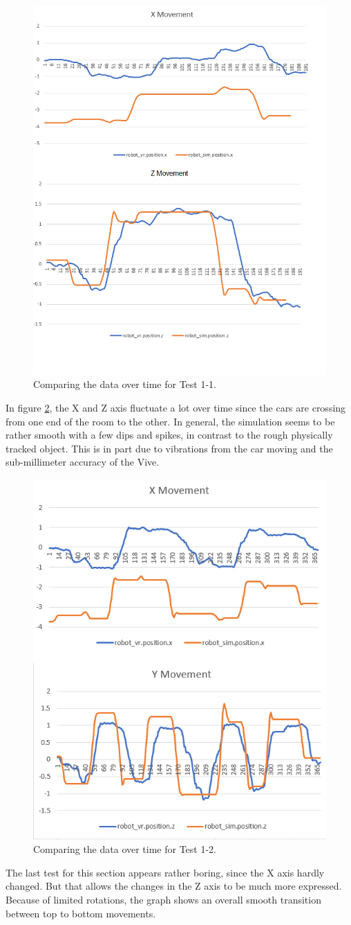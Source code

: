 \documentclass[10pt,a4paper]{article}
\begin{document}
	\begin{figure}
		\centering
		\includegraphics[width=.4\textwidth]{Test1_charts/t1_1_x_z.png}
		\caption{Comparing the data over time for Test 1-1.}
		\label{fig:graph_comp_t1_1}
	\end{figure}
	In figure \ref{fig:graph_comp_t1_2}, the X and Z axis fluctuate a lot over time since the cars are crossing from one end of the room to the other. In general, the simulation seems to be rather smooth with a few dips and spikes, in contrast to the rough physically tracked object. This is in part due to vibrations from the car moving and the sub-millimeter accuracy of the Vive.
	\\
	\begin{figure}
		\centering
		\includegraphics[width=.4\textwidth]{Test1_charts/t1_2_x_z.png}
		\caption{Comparing the data over time for Test 1-2.}
		\label{fig:graph_comp_t1_2}
	\end{figure}
	The last test for this section appears rather boring, since the X axis hardly changed. But that allows the changes in the Z axis to be much more expressed. Because of limited rotations, the graph shows an overall smooth transition between top to bottom movements.
	
\end{document}
